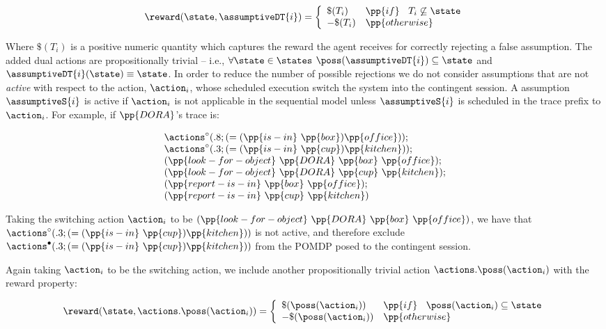 \[
\reward(\state, \assumptiveDT{i}) = \bigg\{ \begin{array}{ll}
\$(T_i) & \pp{if}~\;\;T_i \not\subseteq \state \\
-\$(T_i) & \pp{otherwise} \\
\end{array}
\]

\noindent Where $\$(T_i)$ is a positive numeric quantity which
captures the reward the agent receives for correctly rejecting a
false assumption. The added dual actions are propositionally trivial
-- i.e., $\forall\state\in\states$ $\poss(\assumptiveDT{i})
\subseteq \state$ and $\assumptiveDT{i}(\state) \equiv \state$.  
In order to reduce the number of possible rejections we do not
consider assumptions that are not {\em active} with respect to the
action, $\action_i$, whose scheduled execution switch the system into
the contingent session. A assumption $\assumptiveS{i}$ is active if
$\action_i$ is not applicable in the sequential model unless
$\assumptiveS{i}$ is scheduled in the trace prefix to $\action_i$. For
example, if $\pp{DORA}$'s trace is:

\[
\begin{array}{l}
\actions^{\circ}(.8;(=(\pp{is-in}~\pp{box})\pp{office}));\\
\actions^{\circ}(.3;(=(\pp{is-in}~\pp{cup})\pp{kitchen}));\\
(\pp{look-for-object}~\pp{DORA}~\pp{box}~\pp{office});\\
(\pp{look-for-object}~\pp{DORA}~\pp{cup}~\pp{kitchen});\\
(\pp{report-is-in}~\pp{box}~\pp{office}); \\
(\pp{report-is-in}~\pp{cup}~\pp{kitchen})
\end{array}
\]

\noindent Taking the switching action $\action_i$ to be
$(\pp{look-for-object}~\pp{DORA}~\pp{box}~\pp{office})$, we have that
$\actions^{\circ}(.3;(=(\pp{is-in}~\pp{cup})\pp{kitchen}))$ is not
active, and therefore exclude
$\actions^{\bullet}(.3;(=(\pp{is-in}~\pp{cup})\pp{kitchen}))$ from the
POMDP posed to the contingent session.

Again taking $\action_i$ to be the switching action, we include
another propositionally trivial action $\actions.\poss(\action_i)$
with the reward property:

\[
\reward(\state, \actions.\poss(\action_i)) = \bigg\{ \begin{array}{ll}
\$(\poss(\action_i)) & \pp{if}~\;\; \poss(\action_i) \subseteq \state \\
-\$(\poss(\action_i)) & \pp{otherwise} \\
\end{array}
\]

